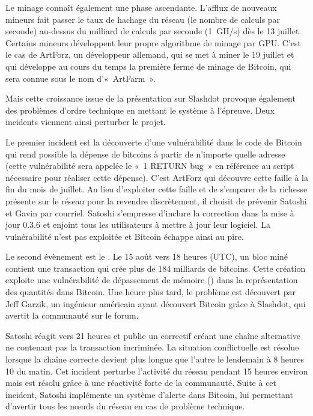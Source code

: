 Le minage connaît également une phase ascendante. L'afflux de nouveaux mineurs fait passer le taux de hachage du réseau (le nombre de calculs par seconde) au-dessus du milliard de calculs par seconde (1~GH/s) dès le 13 juillet. Certains mineurs développent leur propre algorithme de minage par GPU. C'est le cas de ArtForz, un développeur allemand, qui se met à miner le 19 juillet et qui développe au cours du temps la première ferme de minage de Bitcoin, qui sera connue sous le nom d'«~ArtFarm~».


Mais cette croissance issue de la présentation sur Slashdot provoque également des problèmes d'ordre technique en mettant le système à l'épreuve. Deux incidents viennent ainsi perturber le projet.

Le premier incident est la découverte d'une vulnérabilité dans le code de Bitcoin qui rend possible la dépense de bitcoins à partir de n'importe quelle adresse (cette vulnérabilité sera appelée le «~1 RETURN bug~» en référence au script nécessaire pour réaliser cette dépense). C'est ArtForz qui découvre cette faille à la fin du mois de juillet. Au lieu d'exploiter cette faille et de s'emparer de la richesse présente sur le réseau pour la revendre discrètement, il choisit de prévenir Satoshi et Gavin par courriel. Satoshi s'empresse d'inclure la correction dans la mise à jour 0.3.6 et enjoint tous les utilisateurs à mettre à jour leur logiciel. La vulnérabilité n'est pas exploitée et Bitcoin échappe ainsi au pire.

Le second évènement est le . Le 15 août vers 18 heures (UTC), un bloc miné contient une transaction qui crée plus de 184 milliards de bitcoins. Cette création exploite une vulnérabilité de dépassement de mémoire () dans la représentation des quantités dans Bitcoin. Une heure plus tard, le problème est découvert par Jeff Garzik, un ingénieur américain ayant découvert Bitcoin grâce à Slashdot, qui avertit la communauté sur le forum.

Satoshi réagit vers 21 heures et publie un correctif créant une chaîne alternative ne contenant pas la transaction incriminée. La situation conflictuelle est résolue lorsque la chaîne correcte devient plus longue que l'autre le lendemain à 8 heures 10 du matin. Cet incident perturbe l'activité du réseau pendant 15 heures environ mais est résolu grâce à une réactivité forte de la communauté. Suite à cet incident, Satoshi implémente un système d'alerte dans Bitcoin, lui permettant d'avertir tous les nœuds du réseau en cas de problème technique. 

